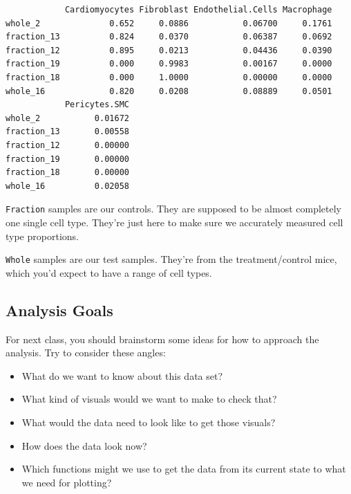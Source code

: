 \documentclass[
  letterpaper,
  DIV=11,
  numbers=noendperiod]{scrreprt}
\providecommand{\tightlist}{%
  \setlength{\itemsep}{0pt}\setlength{\parskip}{0pt}}\usepackage{longtable,booktabs,array}
\begin{document}
\begin{verbatim}
            Cardiomyocytes Fibroblast Endothelial.Cells Macrophage
whole_2              0.652     0.0886           0.06700     0.1761
fraction_13          0.824     0.0370           0.06387     0.0692
fraction_12          0.895     0.0213           0.04436     0.0390
fraction_19          0.000     0.9983           0.00167     0.0000
fraction_18          0.000     1.0000           0.00000     0.0000
whole_16             0.820     0.0208           0.08889     0.0501
            Pericytes.SMC
whole_2           0.01672
fraction_13       0.00558
fraction_12       0.00000
fraction_19       0.00000
fraction_18       0.00000
whole_16          0.02058
\end{verbatim}

\begin{tcolorbox}[enhanced jigsaw, left=2mm, colframe=quarto-callout-note-color-frame, leftrule=.75mm, opacitybacktitle=0.6, toptitle=1mm, title=\textcolor{quarto-callout-note-color}{\faInfo}\hspace{0.5em}{Note}, opacityback=0, coltitle=black, colbacktitle=quarto-callout-note-color!10!white, breakable, colback=white, titlerule=0mm, bottomrule=.15mm, arc=.35mm, bottomtitle=1mm, rightrule=.15mm, toprule=.15mm]

\texttt{Fraction} samples are our controls. They are supposed to be
almost completely one single cell type. They're just here to make sure
we accurately measured cell type proportions.

\texttt{Whole} samples are our test samples. They're from the
treatment/control mice, which you'd expect to have a range of cell
types.

\end{tcolorbox}

\hypertarget{analysis-goals}{%
\subsection{Analysis Goals}\label{analysis-goals}}

For next class, you should brainstorm some ideas for how to approach the
analysis. Try to consider these angles:

\begin{itemize}
\tightlist
\item
  What do we want to know about this data set?
\item
  What kind of visuals would we want to make to check that?
\item
  What would the data need to look like to get those visuals?
\item
  How does the data look now?
\item
  Which functions might we use to get the data from its current state to
  what we need for plotting?
\end{itemize}
\end{document}
